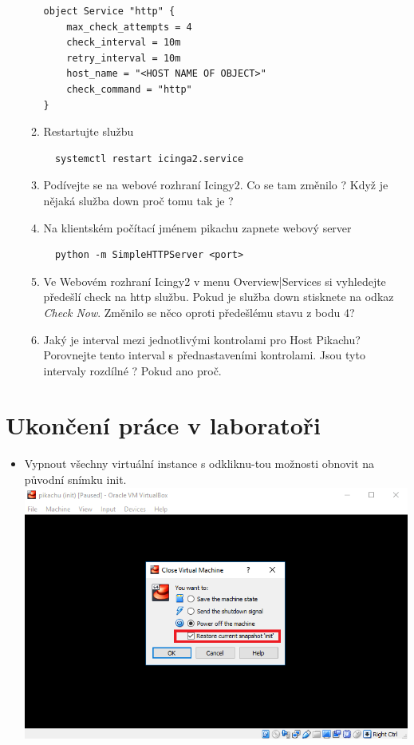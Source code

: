 \begin{itemize}
\begin{enumerate}
\begin{verbatim}
object Service "http" {
    max_check_attempts = 4
    check_interval = 10m
    retry_interval = 10m
    host_name = "<HOST NAME OF OBJECT>"
    check_command = "http"
}

\end{verbatim} 
            \item Restartujte službu
\begin{verbatim}
  systemctl restart icinga2.service
\end{verbatim} 
          \item Podívejte se na webové rozhraní Icingy2. Co se tam změnilo ? 
          Když je nějaká služba down proč tomu tak je ?

          \item Na klientském počítací jménem pikachu zapnete webový server
\begin{verbatim}
  python -m SimpleHTTPServer <port>
\end{verbatim}
          \item Ve Webovém rozhraní Icingy2 v menu Overview|Services si vyhledejte předešlí check na http službu. Pokud je služba down stisknete na odkaz \textit{Check Now}. Změnilo se něco oproti předešlému stavu z bodu 4?

          \item Jaký je interval mezi jednotlivými kontrolami pro Host Pikachu? Porovnejte tento interval s přednastaveními kontrolami. Jsou tyto intervaly rozdílné ? Pokud ano proč.

\end{enumerate}
\end{itemize}

\section*{Ukončení práce v laboratoři}
\begin{itemize}
  \item Vypnout všechny virtuální instance s odkliknu-tou možnosti obnovit na původní snímku init.
          \includegraphics[width=\linewidth]{files/end.PNG}

\end{itemize}
